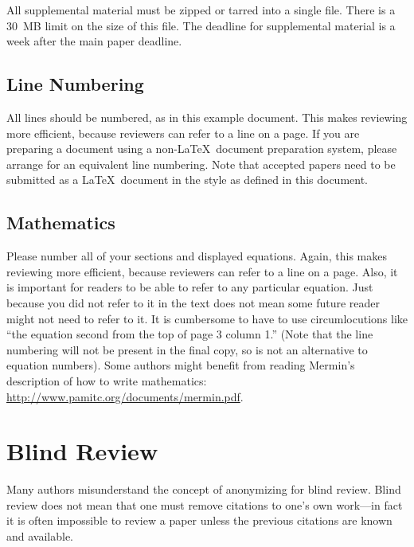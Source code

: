 \documentclass[runningheads]{llncs}
\begin{document}
All supplemental material must be zipped or tarred into a single file. There is a 30~MB limit on the size of this file. The deadline for supplemental material is a week after the main paper deadline.

\subsection{Line Numbering}

All lines should be numbered, as in this example document. This makes
reviewing more efficient, because reviewers can refer to a line on a
page. If you are preparing a document using a non-\LaTeX\
document preparation system, please arrange for an equivalent line numbering. Note that accepted papers need to be submitted as a \LaTeX\
document in the style as defined in this document.

\subsection{Mathematics}

Please number all of your sections and displayed equations.  Again,
this makes reviewing more efficient, because reviewers can refer to a
line on a page.  Also, it is important for readers to be able to refer
to any particular equation.  Just because you did not refer to it in
the text does not mean some future reader might not need to refer to
it.  It is cumbersome to have to use circumlocutions like ``the
equation second from the top of page 3 column 1.''  (Note that the
line numbering will not be present in the final copy, so is not an
alternative to equation numbers).  Some authors might benefit from
reading Mermin's description of how to write mathematics:
\url{http://www.pamitc.org/documents/mermin.pdf}.

\section{Blind Review}
\label{sec:blind}

Many authors misunderstand the concept of anonymizing for blind
review.  Blind review does not mean that one must remove
citations to one's own work---in fact it is often impossible to
review a paper unless the previous citations are known and
available.
\end{document}
